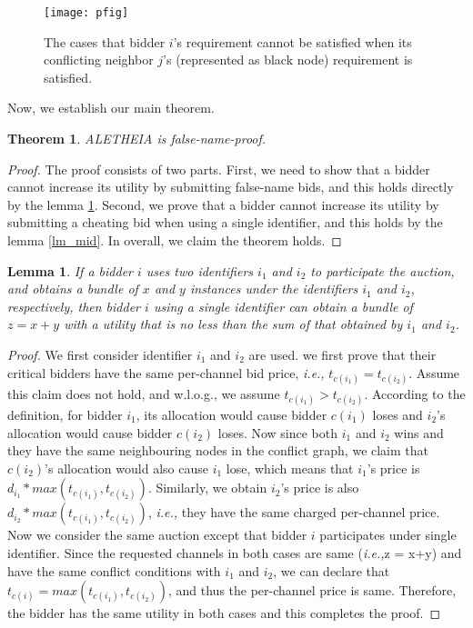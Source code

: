 \documentclass{sig-alternate}
\newtheorem{theorem}{Theorem}
\newtheorem{lemma}{Lemma}
\begin{document}
\begin{figure}[!t]
\centering
\texttt{[image: pfig]}
\caption{The cases that bidder $i$'s requirement cannot be satisfied when its conflicting neighbor $j$'s (represented as black node) requirement is satisfied.}
\label{fig_pro}
\end{figure}

Now, we establish our main theorem.
\begin{theorem}
\label{th_real}
  ALETHEIA is false-name-proof.
\end{theorem}
\begin{proof}
The proof consists of two parts. First, we need to show that a bidder cannot increase its utility by submitting false-name bids, and this holds directly by the lemma \ref{lm_rf}. Second, we prove that a bidder cannot increase its utility by submitting a cheating bid when using a single identifier, and this holds by the lemma \ref{lm_mid}. In overall, we claim the theorem holds.
\end{proof}

\begin{lemma}
\label{lm_rf}
If a bidder $i$ uses two identifiers $i_1$ and $i_2$ to participate the auction, and obtains a bundle of $x$ and $y$ instances under the identifiers $i_1$ and $i_2$, respectively, then bidder $i$ using a single identifier can obtain a bundle of $z = x+y$ with a utility that is no less than the sum of that obtained by $i_1$ and $i_2$.
\end{lemma}
\begin{proof}
We first consider identifier $i_1$ and $i_2$ are used. we first prove that their critical bidders have the same per-channel bid price, \emph{i.e.,} $t_{c(i_1)} = t_{c(i_2)}$. Assume this claim does not hold, and w.l.o.g., we assume $t_{c(i_1)} > t_{c(i_2)}$. According to the definition, for bidder $i_1$, its allocation would cause bidder $c(i_1)$ loses and  $i_2$'s allocation would cause bidder $c(i_2)$ loses. Now since both $i_1$ and $i_2$ wins and they have the same neighbouring nodes in the conflict graph, we claim that $c(i_2)$'s allocation would also cause $i_1$ lose, which means that $i_1$'s price is $d_{i_1}*max(t_{c(i_1)}, t_{c(i_2)})$. Similarly, we obtain  $i_2$'s price is also $d_{i_2}*max(t_{c(i_1)}, t_{c(i_2)})$, \emph{i.e.,} they have the same charged per-channel price. Now we consider the same auction except that bidder $i$ participates under single identifier. Since the requested channels in both cases are same (\emph{i.e.,}z = x+y) and have the same conflict conditions with $i_1$ and $i_2$, we can declare that $t_{c(i)} = max(t_{c(i_1)}, t_{c(i_2)})$, and thus the per-channel price is same. Therefore, the bidder has the same utility in both cases and this completes the proof.
\end{proof}
\end{document}

